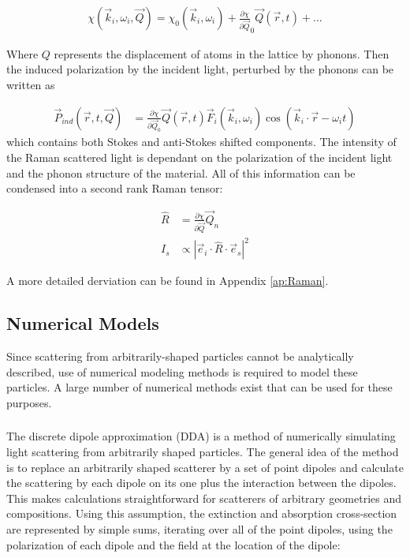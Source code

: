             \begin{align}
                \chi(\vec{k}_i, \omega_i, \vec{Q}) = \chi_0(\vec{k}_i, \omega_i) + \frac{\partial\chi}{\partial\vec{Q}}_0\vec{Q}(\vec{r},t) + ...
            \end{align}

            Where $Q$ represents the displacement of atoms in the lattice by phonons.
            Then the induced polarization by the incident light, perturbed by the phonons can be written as

            \begin{align}
                \vec{P}_{ind}(\vec{r}, t, \vec{Q}) &= \frac{\partial\chi}{\partial\vec{Q}_0}\vec{Q}(\vec{r},t)
                                                        \vec{F}_i(\vec{k}_i, \omega_i)\cos(\vec{k}_i\cdot\vec{r}-\omega_i t)
            \end{align}
            which contains both Stokes and anti-Stokes shifted components. The intensity of the Raman scattered light
            is dependant on the polarization of the incident light and the phonon structure of the material. All of this
            information can be condensed into a second rank Raman tensor:

            \begin{align}
                \hat{R} &= \frac{\partial\chi}{\partial\vec{Q}}\vec{Q}_n \\
                I_s &\propto | \vec{e}_i \cdot \hat{R} \cdot\vec{e}_s|^2
            \end{align}

            A more detailed derviation can be found in Appendix \ref{ap:Raman}.

    \subsection{Numerical Models}
            Since scattering from arbitrarily-shaped particles cannot be analytically described, use of numerical modeling methods
        is required to model these particles. A large number of numerical methods exist that can be used for these purposes.

        \subsubsection{}
                The discrete dipole approximation (DDA) is a method of numerically simulating light scattering from arbitrarily shaped particles.
            The general idea of the method is to replace an arbitrarily shaped scatterer by a set of point dipoles and calculate the
            scattering by each dipole on its one plus the interaction between the dipoles. This makes calculations straightforward
            for scatterers of arbitrary geometries and compositions. Using this assumption, the extinction and absorption cross-section
            are represented by simple sums, iterating over all of the point dipoles, using the polarization of each dipole and the field at
            the location of the dipole:

